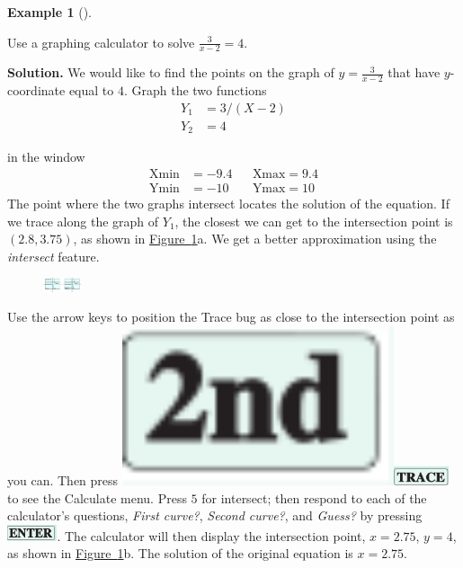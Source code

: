 \documentclass[10pt,]{book}
\theoremstyle{plain}
\theoremstyle{definition}
\theoremstyle{definition}
\newtheorem{example}[theorem]{Example}
\numberwithin{equation}{section}
\newcommand{\amp}{ & }
\begin{document}
\begin{example}[]\label{example-GC-nonlinear-equation}

        Use a graphing calculator to solve \(\frac{3}{x −2}= 4.\)
\par\medskip\noindent%
\textbf{Solution.}\quad 
    We would like to find the points on the graph of \(y = \frac{3}{x −2}\) that have \(y\)-coordinate equal to \(4\). Graph the two functions
    \begin{align}
    Y_1 \amp = 3/(X − 2)  \\
    Y_2 \amp = 4
    \end{align}

    in the window
    \begin{align}
    \text{Xmin} \amp = −9.4 \amp\amp \text{Xmax} = 9.4\\
    \text{Ymin} \amp = −10 \amp\amp \text{Ymax} = 10
    \end{align}
    The point where the two graphs intersect locates the solution of the equation. If we trace along the graph of \(Y_1\), the closest we can get to the intersection point is \((2.8, 3.75)\), as shown in \hyperref[fig-GC-nonlinear]{Figure~\ref{fig-GC-nonlinear}}a. We get a better approximation using the \emph{intersect} feature.
    \leavevmode%
\begin{figure}
\centering
\includegraphics[width=0.100\textwidth,]{images/fig-GC-nonlinear.svg}\caption{\label{fig-GC-nonlinear}}
\end{figure}


    Use the arrow keys to position the Trace bug as close to the intersection point as you can. Then press \includegraphics[width=0.6\textwidth,]{images/icon-2nd.svg}\includegraphics[width=0.12\textwidth,]{images/icon-trace.svg} to see the Calculate menu. Press \(5\) for intersect; then respond to each of the calculator's questions, \emph{First curve?}, \emph{Second curve?}, and \emph{Guess?} by pressing \includegraphics[width=0.11\textwidth,]{images/icon-enter.svg}. The calculator will then display the intersection point, \(x = 2.75\), \(y = 4\), as shown in \hyperref[fig-GC-nonlinear]{Figure~\ref{fig-GC-nonlinear}}b. The solution of the original equation is \(x = 2.75\).
\end{example}
\end{document}
